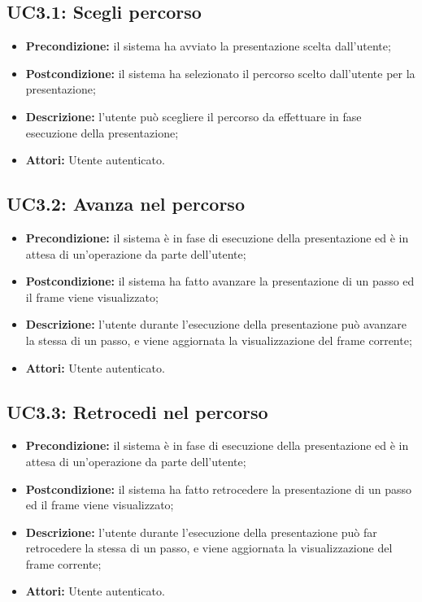 \subsection{ UC3.1: Scegli percorso}

\begin{itemize}
	\item \textbf{Precondizione:} il sistema ha avviato la presentazione scelta dall'utente;
	\item \textbf{Postcondizione:} il sistema ha selezionato il percorso scelto dall'utente per la presentazione;
	\item \textbf{Descrizione:} l'utente può scegliere il percorso da effettuare in fase esecuzione della presentazione;
	\item \textbf{Attori:} Utente autenticato.
\end{itemize}
\subsection{ UC3.2: Avanza nel percorso}

\begin{itemize}
	\item \textbf{Precondizione:} il sistema è in fase di esecuzione della presentazione ed è in attesa di un'operazione da parte dell'utente;
	\item \textbf{Postcondizione:} il sistema ha fatto avanzare la presentazione di un passo ed il frame viene visualizzato;
	\item \textbf{Descrizione:} l'utente durante l'esecuzione della presentazione può avanzare la stessa di un passo, e viene aggiornata la visualizzazione del frame corrente;
	\item \textbf{Attori:} Utente autenticato.
\end{itemize}
\subsection{ UC3.3: Retrocedi nel percorso}

\begin{itemize}
	\item \textbf{Precondizione:} il sistema è in fase di esecuzione della presentazione ed è in attesa di un'operazione da parte dell'utente;
	\item \textbf{Postcondizione:} il sistema ha fatto retrocedere la presentazione di un passo ed il frame viene visualizzato;
	\item \textbf{Descrizione:} l'utente durante l'esecuzione della presentazione può far retrocedere la stessa di un passo, e viene aggiornata la visualizzazione del frame corrente;
	\item \textbf{Attori:} Utente autenticato.
\end{itemize}
